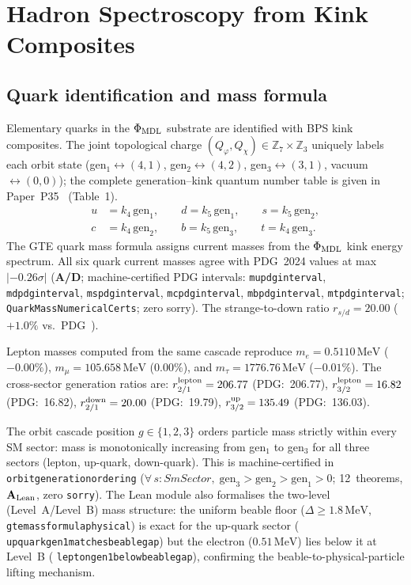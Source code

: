 \documentclass[11pt]{article}
\theoremstyle{remark}
\newcommand{\phimdl}{\Phi_{\rm MDL}}
\newcommand{\lean}[1]{%
  \penalty-100
  \begingroup\def\_{\textunderscore\allowbreak}\texttt{#1}\endgroup}
\newcommand{\CatAL}{\ensuremath{\textbf{A}_{\rm Lean}}}
\newcommand{\CatAD}{\textbf{A/D}}
\begin{document}
\section{Hadron Spectroscopy from Kink Composites}
\label{sec:hadron}

\subsection{Quark identification and mass formula}
\label{ssec:quarkmass}

Elementary quarks in the $\phimdl$ substrate are identified with BPS kink
composites.
The joint topological charge $(Q_\varphi, Q_\chi) \in \mathbb{Z}_7 \times \mathbb{Z}_3$ uniquely
labels each orbit state (gen$_1 \leftrightarrow (4,1)$, gen$_2 \leftrightarrow (4,2)$,
gen$_3 \leftrightarrow (3,1)$, vacuum $\leftrightarrow (0,0)$); the complete generation--kink
quantum number table is given in Paper~P35~\cite{SpivackGTEUnification} (Table~1).
\begin{align}
  u &= k_4\,\text{gen}_1, \qquad d = k_5\,\text{gen}_1, \qquad
  s = k_5\,\text{gen}_2, \\
  c &= k_4\,\text{gen}_2, \qquad b = k_5\,\text{gen}_3, \qquad
  t = k_4\,\text{gen}_3.
\end{align}
The GTE quark mass formula assigns current masses from the $\phimdl$ kink energy
spectrum.
All six quark current masses agree with PDG~2024 values at max $|{-}0.26\sigma|$
(\CatAD{}; machine-certified PDG intervals: \lean{m\_u\_pdg\_interval}, \lean{m\_d\_pdg\_interval},
\lean{m\_s\_pdg\_interval}, \lean{m\_c\_pdg\_interval}, \lean{m\_b\_pdg\_interval},
\lean{m\_t\_pdg\_interval}; \lean{QuarkMassNumericalCerts}; zero sorry).
The strange-to-down ratio $r_{s/d} = 20.00$ ($+1.0\%$ vs.\
PDG~\cite{ParticleDataGroup2024}).

Lepton masses computed from the same cascade reproduce
$m_e = 0.5110\,\mathrm{MeV}$ ($-0.00\%$), $m_\mu = 105.658\,\mathrm{MeV}$
($0.00\%$), and $m_\tau = 1776.76\,\mathrm{MeV}$ ($-0.01\%$).
The cross-sector generation ratios are: $r^{\rm lepton}_{2/1} = 206.77$ (PDG:~206.77),
$r^{\rm lepton}_{3/2} = 16.82$ (PDG:~16.82), $r^{\rm down}_{2/1} = 20.00$ (PDG:~19.79),
$r^{\rm up}_{3/2} = 135.49$ (PDG:~136.03).

The orbit cascade position $g \in \{1,2,3\}$ orders particle mass
strictly within every SM sector: mass is monotonically increasing from
gen$_1$ to gen$_3$ for all three sectors (lepton, up-quark, down-quark).
This is machine-certified in \lean{orbit\_generation\_ordering}
($\forall\,s : \textit{SmSector},\; \text{gen}_3 > \text{gen}_2 > \text{gen}_1 > 0$;
12~theorems, \CatAL{}, zero \texttt{sorry}).
The Lean module also formalises the two-level (Level~A/Level~B) mass structure:
the uniform beable floor ($\Delta \geq 1.8\,\mathrm{MeV}$,
\lean{gte\_mass\_formula\_physical}) is exact for the up-quark sector
(\lean{up\_quark\_gen1\_matches\_beable\_gap}) but the electron ($0.51\,\mathrm{MeV}$)
lies below it at Level~B (\lean{lepton\_gen1\_below\_beable\_gap}), confirming
the beable-to-physical-particle lifting mechanism.
\end{document}
